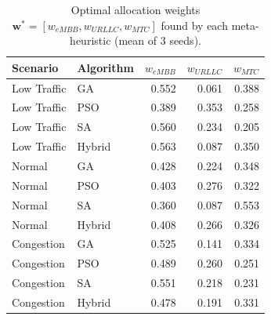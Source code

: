\begin{table}[H]
\centering
\caption{Optimal allocation weights $\mathbf{w}^* = [w_{eMBB}, w_{URLLC}, w_{MTC}]$ found by each meta-heuristic (mean of 3 seeds).}
\label{tab:weights}
\begin{tabular}{llrrr}
\toprule
\textbf{Scenario} & \textbf{Algorithm} & \textbf{$w_{eMBB}$} & \textbf{$w_{URLLC}$} & \textbf{$w_{MTC}$} \\
\midrule
Low Traffic  & GA     & 0.552 & 0.061 & 0.388 \\
Low Traffic  & PSO    & 0.389 & 0.353 & 0.258 \\
Low Traffic  & SA     & 0.560 & 0.234 & 0.205 \\
Low Traffic  & Hybrid & 0.563 & 0.087 & 0.350 \\
\midrule
Normal       & GA     & 0.428 & 0.224 & 0.348 \\
Normal       & PSO    & 0.403 & 0.276 & 0.322 \\
Normal       & SA     & 0.360 & 0.087 & 0.553 \\
Normal       & Hybrid & 0.408 & 0.266 & 0.326 \\
\midrule
Congestion   & GA     & 0.525 & 0.141 & 0.334 \\
Congestion   & PSO    & 0.489 & 0.260 & 0.251 \\
Congestion   & SA     & 0.551 & 0.218 & 0.231 \\
Congestion   & Hybrid & 0.478 & 0.191 & 0.331 \\
\bottomrule
\end{tabular}
\end{table}
